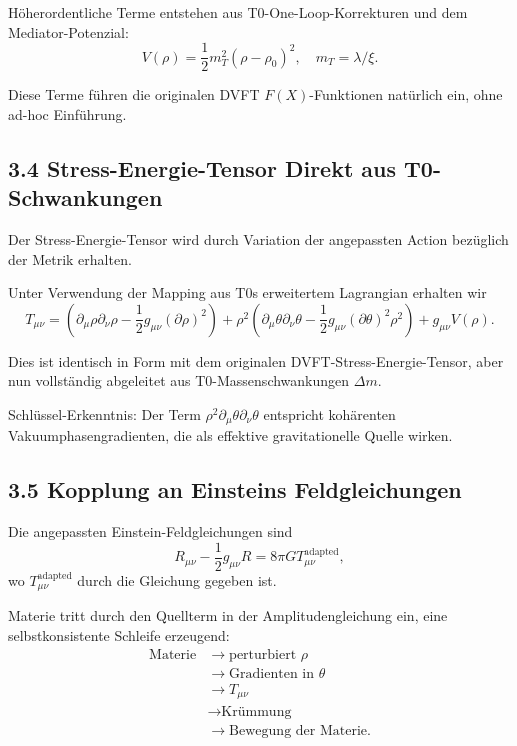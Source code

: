 	Höherordentliche Terme entstehen aus T0-One-Loop-Korrekturen und dem Mediator-Potenzial:
	\[
	V(\rho) = \frac{1}{2} m_T^2 (\rho - \rho_0)^2, \quad m_T = \lambda / \xi.
	\]
	
	Diese Terme führen die originalen DVFT $F(X)$-Funktionen natürlich ein, ohne ad-hoc Einführung.
	
	\subsection{3.4 Stress-Energie-Tensor Direkt aus T0-Schwankungen}
	
	Der Stress-Energie-Tensor wird durch Variation der angepassten Action bezüglich der Metrik erhalten.
	
	Unter Verwendung der Mapping aus T0s erweitertem Lagrangian erhalten wir
	\[
	T_{\mu\nu} = (\partial_\mu \rho \partial_\nu \rho - \frac{1}{2} g_{\mu\nu} (\partial \rho)^2) + \rho^2 (\partial_\mu \theta \partial_\nu \theta - \frac{1}{2} g_{\mu\nu} (\partial \theta)^2 \rho^2) + g_{\mu\nu} V(\rho).
	\]
	
	Dies ist identisch in Form mit dem originalen DVFT-Stress-Energie-Tensor, aber nun vollständig abgeleitet aus T0-Massenschwankungen $\Delta m$.
	
	Schlüssel-Erkenntnis: Der Term $\rho^2 \partial_\mu \theta \partial_\nu \theta$ entspricht kohärenten Vakuumphasengradienten, die als effektive gravitationelle Quelle wirken.
	
	\subsection{3.5 Kopplung an Einsteins Feldgleichungen}
	
	Die angepassten Einstein-Feldgleichungen sind
	\[
	R_{\mu\nu} - \frac{1}{2} g_{\mu\nu} R = 8\pi G T_{\mu\nu}^{\text{adapted}},
	\]
	wo $T_{\mu\nu}^{\text{adapted}}$ durch die Gleichung gegeben ist.
	
	Materie tritt durch den Quellterm in der Amplitudengleichung ein, eine selbstkonsistente Schleife erzeugend:
\[
\begin{aligned}
	\text{Materie} &\to \text{perturbiert } \rho \\
	&\to \text{Gradienten in } \theta \\
	&\to T_{\mu\nu} \\
	&\to \text{Krümmung} \\
	&\to \text{Bewegung der Materie}.
\end{aligned}
\]

